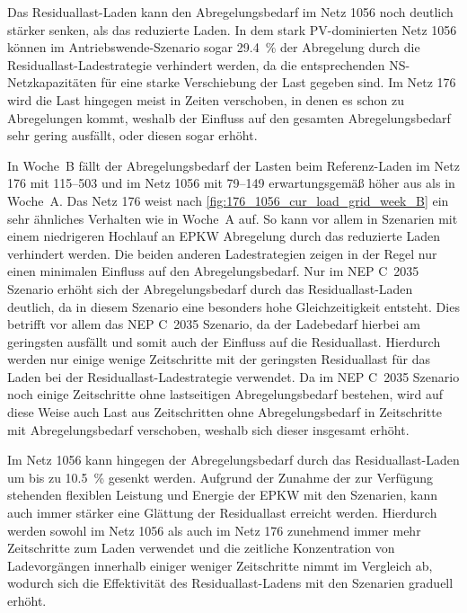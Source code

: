 Das Residuallast-Laden kann den Abregelungsbedarf im Netz \num{1056} noch deutlich stärker senken, als das reduzierte Laden.
In dem stark \gls{PV}-dominierten Netz \num{1056} können im Antriebswende-Szenario sogar \SI{29.4}{\percent} der Abregelung durch die Residuallast-Ladestrategie verhindert werden, da die entsprechenden \gls{NS}-Netzkapazitäten für eine starke Verschiebung der Last gegeben sind.
Im Netz \num{176} wird die Last hingegen meist in Zeiten verschoben, in denen es schon zu Abregelungen kommt, weshalb der Einfluss auf den gesamten Abregelungsbedarf sehr gering ausfällt, oder diesen sogar erhöht.



In Woche~B fällt der Abregelungsbedarf der Lasten beim Referenz-Laden im Netz \num{176} mit \SIrange{115}{503}{\mwh} und im Netz \num{1056} mit \SIrange{79}{149}{\mwh} erwartungsgemäß höher aus als in Woche~A.
Das Netz \num{176} weist nach \autoref{fig:176_1056_cur_load_grid_week_B} ein sehr ähnliches Verhalten wie in Woche~A auf.
So kann vor allem in Szenarien mit einem niedrigeren Hochlauf an \gls{EPKW} Abregelung durch das reduzierte Laden verhindert werden.
Die beiden anderen Ladestrategien zeigen in der Regel nur einen minimalen Einfluss auf den Abregelungsbedarf.
Nur im NEP C~\num{2035} Szenario erhöht sich der Abregelungsbedarf durch das Residuallast-Laden deutlich, da in diesem Szenario eine besonders hohe Gleichzeitigkeit entsteht.
Dies betrifft vor allem das NEP C~\num{2035} Szenario, da der Ladebedarf hierbei am geringsten ausfällt und somit auch der Einfluss auf die Residuallast.
Hierdurch werden nur einige wenige Zeitschritte mit der geringsten Residuallast für das Laden bei der Residuallast-Ladestrategie verwendet.
Da im NEP C~\num{2035} Szenario noch einige Zeitschritte ohne lastseitigen Abregelungsbedarf bestehen, wird auf diese Weise auch Last aus Zeitschritten ohne Abregelungsbedarf in Zeitschritte mit Abregelungsbedarf verschoben, weshalb sich dieser insgesamt erhöht.\medskip

Im Netz \num{1056} kann hingegen der Abregelungsbedarf durch das Residuallast-Laden um bis zu \SI{10.5}{\percent} gesenkt werden.
Aufgrund der Zunahme der zur Verfügung stehenden flexiblen Leistung und Energie der \gls{EPKW} mit den Szenarien, kann auch immer stärker eine Glättung der Residuallast erreicht werden.
Hierdurch werden sowohl im Netz \num{1056} als auch im Netz \num{176} zunehmend immer mehr Zeitschritte zum Laden verwendet und die zeitliche Konzentration von Ladevorgängen innerhalb einiger weniger Zeitschritte nimmt im Vergleich ab, wodurch sich die Effektivität des Residuallast-Ladens mit den Szenarien graduell erhöht.

